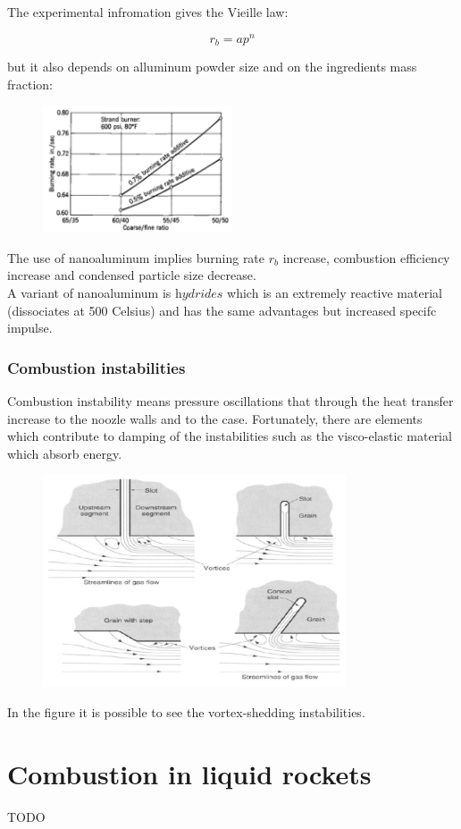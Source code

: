 \documentclass[12pt]{article}
\begin{document}
The experimental infromation gives the Vieille law:

\begin{equation}
  r_{b} = ap^{n}
\end{equation}

but it also depends on alluminum powder size and on the ingredients mass fraction:

\begin{figure}[!ht]
\centering
\includegraphics[width=0.5\textwidth]{figures/burning3.png}
\end{figure}

The use of nanoaluminum implies burning rate $r_{b}$ increase, combustion efficiency increase and condensed particle size decrease.\\
A variant of nanoaluminum is $\textit{hydrides}$ which is an extremely reactive material (dissociates at 500 Celsius) and has the same advantages but increased specifc impulse.

\subsubsection{Combustion instabilities}

Combustion instability means pressure oscillations that through the heat transfer increase to the noozle walls and to the case. Fortunately, there are elements which contribute to damping of the instabilities such as the visco-elastic material which absorb energy.

\begin{figure}[!ht]
\centering
\includegraphics[width=0.8\textwidth]{figures/vortex.png}
\end{figure}

In the figure it is possible to see the vortex-shedding instabilities.

\newpage

\section{Combustion in liquid rockets}

TODO
\end{document}
